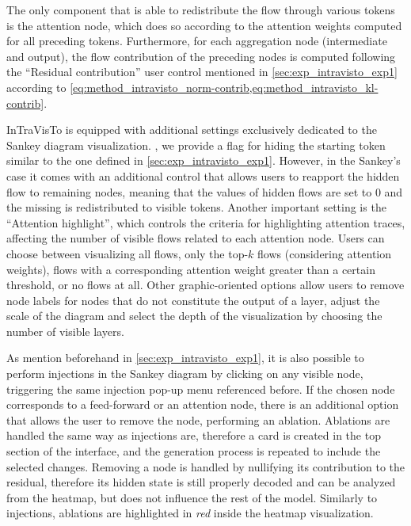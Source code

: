 The only component that is able to redistribute the flow through various tokens is the attention node, which does so according to the attention weights computed for all preceding tokens.
Furthermore, for each aggregation node (intermediate and output), the flow contribution of the preceding nodes is computed following the ``Residual contribution'' user control mentioned in \cref{sec:exp_intravisto_exp1} according to \cref{eq:method_intravisto_norm-contrib,eq:method_intravisto_kl-contrib}.

InTraVisTo is equipped with additional settings exclusively dedicated to the Sankey diagram visualization.
, we provide a flag for hiding the starting token similar to the one defined in \cref{sec:exp_intravisto_exp1}.
However, in the Sankey's case it comes with an additional control that allows users to reapport the hidden flow to remaining nodes, meaning that the values of hidden flows are set to $0$ and the missing  is redistributed to visible tokens.
Another important setting is the ``Attention highlight'', which controls the criteria for highlighting attention traces, affecting the number of visible flows related to each attention node.
Users can choose between visualizing all flows, only the top-$k$ flows (considering attention weights),  flows with a corresponding attention weight greater than a certain threshold, or no flows at all.
Other graphic-oriented options allow users to remove node labels for nodes that do not constitute the output of a layer, adjust the scale of the diagram and select the depth of the visualization by choosing the number of visible layers.

As mention beforehand in \cref{sec:exp_intravisto_exp1}, it is also possible to perform injections in the Sankey diagram by clicking on any visible node, triggering the same injection pop-up menu referenced before.
If the chosen node corresponds to a feed-forward  or an attention node, there is an additional option that allows the user to remove the node, performing an ablation.
Ablations are handled the same way as injections are, therefore a card is created in the top section of the interface, and the generation process is repeated to include the selected changes.
Removing a node is handled by nullifying its contribution to the residual, therefore its hidden state is still properly decoded and can be analyzed from the heatmap, but does not influence the rest of the model.
Similarly to injections, ablations are highlighted in \textit{red} inside the heatmap visualization.

